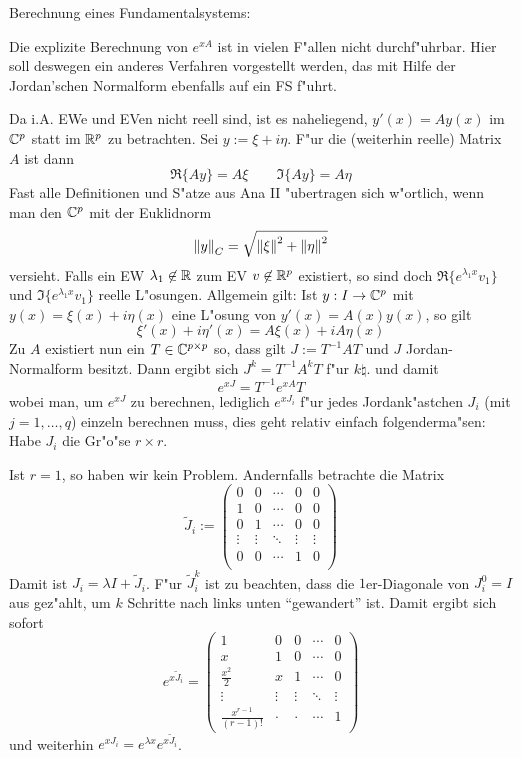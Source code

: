 \deduction Berechnung eines Fundamentalsystems:{
  Die explizite Berechnung von $e^{xA}$ ist in vielen F"allen nicht 
  durchf"uhrbar. Hier soll deswegen ein anderes Verfahren vorgestellt werden, 
  das mit Hilfe der Jordan'schen Normalform ebenfalls auf ein FS f"uhrt.
  
  Da i.A. EWe und EVen nicht reell sind, ist es naheliegend,
  $y'(x)=Ay(x)$ im $\mathbb C^p$ statt im $\mathbb R^p$ zu betrachten.
  Sei $y:=\xi+i\eta$.
  F"ur die (weiterhin reelle) Matrix $A$ ist dann 
  \[\Re \{Ay\}=A\xi\qquad \Im \{Ay\}=A\eta
    \]
  Fast alle Definitionen und S"atze aus Ana II "ubertragen sich w"ortlich,
  wenn man den $\mathbb C^p$ mit der Euklidnorm
  \[{\left\| y\right\|}_C=\sqrt{{\left\| \xi\right\|}^2+{\left\| \eta\right\|}^2}
    \]
  versieht.
  Falls ein EW $\lambda_1\not\in\mathbb R$ zum EV $v\not\in\mathbb R^p$ existiert,
  so sind doch $\Re\{e^{\lambda_1x}v_1\}$ und $\Im\{e^{\lambda_1x}v_1\}$
  reelle L"osungen. Allgemein gilt: Ist $y:I\to\mathbb C^p$ mit
  $y(x)=\xi(x)+i\eta(x)$ eine L"osung von $y'(x)=A(x)y(x)$, so
  gilt
  \[\xi'(x)+i\eta'(x)=A\xi(x)+iA\eta(x)
    \]
  Zu $A$ existiert nun ein $T\in\mathbb C^{p\times p}$ 
  so, dass gilt $J:=T^{-1}AT$ und $J$ Jordan-Normalform besitzt.
  Dann ergibt sich $J^k=T^{-1}A^kT$ f"ur $k\natural$. und damit
  \[e^{xJ}=T^{-1}e^{xA}T
    \]
  wobei man, um $e^{xJ}$ zu berechnen, lediglich $e^{xJ_i}$ f"ur jedes
  Jordank"astchen $J_i$ (mit $j=1,\ldots,q$) einzeln berechnen muss,
  dies geht relativ einfach folgenderma"sen: Habe $J_i$ die Gr"o"se
  $r\times r$.
  
  Ist $r=1$, so haben wir kein Problem. Andernfalls betrachte die Matrix
  \[\tilde J_i:=\begin{pmatrix}
      0 & 0 & \cdots & 0 & 0 \\
      1 & 0 & \cdots & 0 & 0 \\
      0 & 1 & \cdots & 0 & 0 \\
      \vdots & \vdots & \ddots & \vdots & \vdots \\
      0 & 0 & \cdots & 1 & 0 \\
      \end{pmatrix}
    \]
  Damit ist $J_i=\lambda I+\tilde J_i$. F"ur $\tilde J_i^k$ ist zu beachten,
  dass die $1$er-Diagonale von $J_i^0=I$ aus gez"ahlt, um $k$ Schritte
  nach links unten ``gewandert'' ist. Damit ergibt sich sofort
  \[e^{x\tilde J_i}=\begin{pmatrix}
      1 & 0 & 0 & \cdots & 0 \\
      x & 1 & 0 & \cdots & 0 \\
      \frac {x^2} 2 & x & 1 & \cdots & 0 \\
      \vdots & \vdots & \vdots & \ddots & \vdots \\
      \frac {x^{r-1}}{(r-1)!} & \cdot & \cdot & \cdots & 1 
      \end{pmatrix}
    \]
  und weiterhin $e^{xJ_i}=e^{\lambda x}e^{x\tilde J_i}$.
  
}

